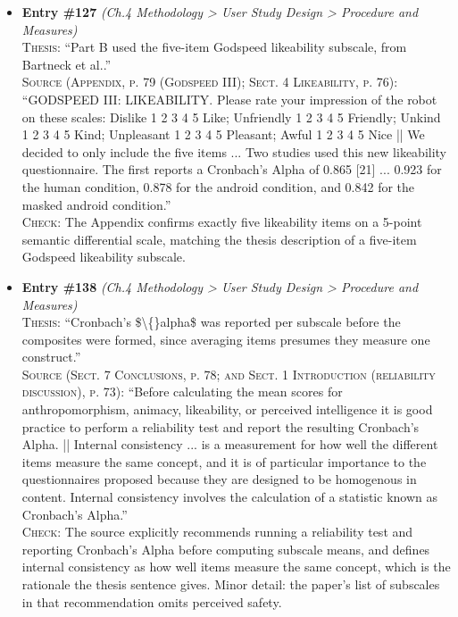 \documentclass[11pt, a4paper]{article}
\begin{document}
\begin{itemize}[leftmargin=1.2em,itemsep=4pt]
\textsc{Check:} The paper presents the likeability items as one of the five Godspeed questionnaires (named 'Godspeed' in Sect. 7 Conclusions), so it is the correct source for likeability items.
\item \textbf{Entry \#127} \textit{(Ch.4 Methodology > User Study Design > Procedure and Measures)}\\
\textsc{Thesis:} ``Part B used the five-item Godspeed likeability subscale, from Bartneck et al..''\\
\textsc{Source (Appendix, p. 79 (Godspeed III); Sect. 4 Likeability, p. 76):} ``GODSPEED III: LIKEABILITY. Please rate your impression of the robot on these scales: Dislike 1 2 3 4 5 Like; Unfriendly 1 2 3 4 5 Friendly; Unkind 1 2 3 4 5 Kind; Unpleasant 1 2 3 4 5 Pleasant; Awful 1 2 3 4 5 Nice || We decided to only include the five items ... Two studies used this new likeability questionnaire. The first reports a Cronbach's Alpha of 0.865 [21] ... 0.923 for the human condition, 0.878 for the android condition, and 0.842 for the masked android condition.''\\
\textsc{Check:} The Appendix confirms exactly five likeability items on a 5-point semantic differential scale, matching the thesis description of a five-item Godspeed likeability subscale.
\item \textbf{Entry \#138} \textit{(Ch.4 Methodology > User Study Design > Procedure and Measures)}\\
\textsc{Thesis:} ``Cronbach's \$\textbackslash\{\}alpha\$ was reported per subscale before the composites were formed, since averaging items presumes they measure one construct.''\\
\textsc{Source (Sect. 7 Conclusions, p. 78; and Sect. 1 Introduction (reliability discussion), p. 73):} ``Before calculating the mean scores for anthropomorphism, animacy, likeability, or perceived intelligence it is good practice to perform a reliability test and report the resulting Cronbach's Alpha. || Internal consistency ... is a measurement for how well the different items measure the same concept, and it is of particular importance to the questionnaires proposed because they are designed to be homogenous in content. Internal consistency involves the calculation of a statistic known as Cronbach's Alpha.''\\
\textsc{Check:} The source explicitly recommends running a reliability test and reporting Cronbach's Alpha before computing subscale means, and defines internal consistency as how well items measure the same concept, which is the rationale the thesis sentence gives. Minor detail: the paper's list of subscales in that recommendation omits perceived safety.
\end{itemize}
\end{document}
